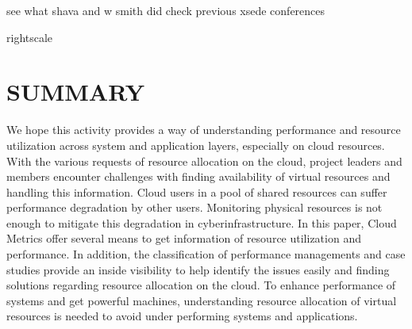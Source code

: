 \documentclass{sig-alternate-05-2015}
\begin{document}
see what shava and w smith did check previous xsede conferences

rightscale


\section{SUMMARY}



We hope this activity provides a way of understanding performance and resource utilization across system and application layers, especially on cloud resources. With the various requests of resource allocation on the cloud, project leaders and members encounter challenges with finding availability of virtual resources and handling this information. Cloud users in a pool of shared resources can suffer performance degradation by other users. Monitoring physical resources is not enough to mitigate this degradation in cyberinfrastructure. In this paper, Cloud Metrics offer several means to get information of resource utilization and performance. In addition, the classification of performance managements and case studies provide an inside visibility to help identify the issues easily and finding solutions regarding resource allocation on the cloud. To enhance performance of systems and get powerful machines, understanding resource allocation of virtual resources is needed to avoid under performing systems and applications.
\end{document}
